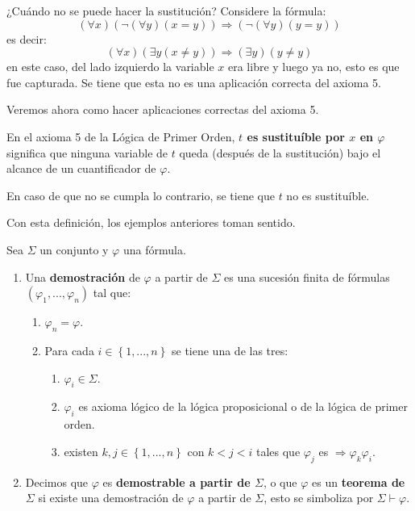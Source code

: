 \documentclass[12pt]{report}
\newcounter{it}
\theoremstyle{largebreak}
\begin{document}
    \begin{exa}
        ¿Cuándo no se puede hacer la sustitución? Considere la fórmula:
        \begin{equation*}
            (\forall x)(\neg(\forall y)(x=y))\Rightarrow(\neg(\forall y)(y=y))
        \end{equation*}
        es decir:
        \begin{equation*}
            (\forall x)(\exists y(x\neq y))\Rightarrow (\exists y)(y\neq y)
        \end{equation*}
        en este caso, del lado izquierdo la variable $x$ era libre y luego ya no, esto es que fue capturada. Se tiene que esta no es una aplicación correcta del axioma 5.
    \end{exa}

    Veremos ahora como hacer aplicaciones correctas del axioma 5.

    \begin{mydef}
        En el axioma 5 de la Lógica de Primer Orden, \textbf{$t$ es sustituíble por $x$ en $\varphi$} significa que ninguna variable de $t$ queda (después de la sustitución) bajo el alcance de un cuantificador de $\varphi$.

        En caso de que no se cumpla lo contrario, se tiene que $t$ no es sustituíble.
    \end{mydef}

    Con esta definición, los ejemplos anteriores toman sentido.

    \begin{mydef}
        Sea $\Sigma$ un conjunto y $\varphi$ una fórmula.
        \begin{enumerate}
            \item Una \textbf{demostración} de $\varphi$ a partir de $\Sigma$ es una sucesión finita de fórmulas $(\varphi_1,...,\varphi_n)$ tal que:
            \begin{enumerate}
                \item $\varphi_n=\varphi$.
                \item Para cada $i\in\left\{1,...,n\right\}$ se tiene una de las tres:
                \begin{enumerate}
                    \item $\varphi_i\in\Sigma$.
                    \item $\varphi_i$ es axioma lógico de la lógica proposicional o de la lógica de primer orden.
                    \item existen $k,j\in\left\{1,...,n\right\}$ con $k<j<i$ tales que $\varphi_j$ es $\Rightarrow\varphi_k\varphi_i$.
                \end{enumerate}
            \end{enumerate}
            \item Decimos que $\varphi$ es \textbf{demostrable a partir de $\Sigma$}, o que $\varphi$ es un \textbf{teorema de $\Sigma$} si existe una demostración de $\varphi$ a partir de $\Sigma$, esto se simboliza por $\Sigma\vdash\varphi$.
        \end{enumerate}
    \end{mydef}
\end{document}
